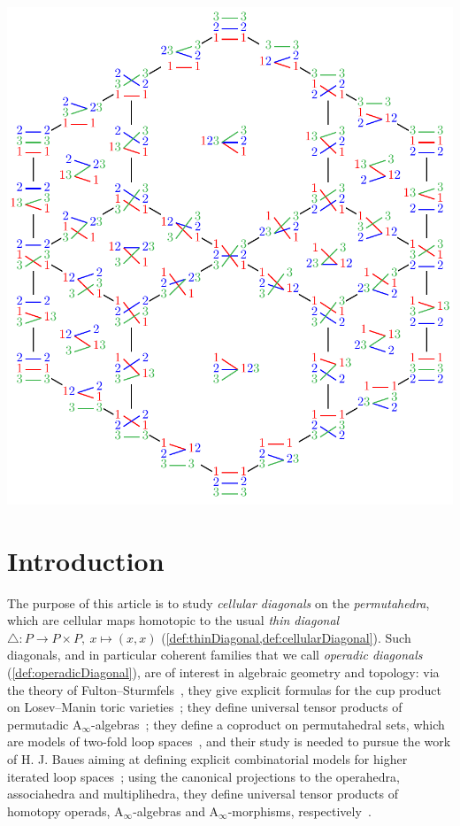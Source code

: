 \documentclass{amsart}
\theoremstyle{definition}
\newcommand{\Ainf}{\ensuremath{\mathrm{A}_\infty}}
\begin{document}
\vspace*{-.6cm}
\centerline{\includegraphics[scale=.75]{diagonalPermutahedron3}}
\vspace*{-.2cm}

\newpage
\enlargethispage{1cm}
\tableofcontents


\newpage
\section*{Introduction} 
\label{s:introduction}

The purpose of this article is to study \emph{cellular diagonals} on the \emph{permutahedra}, which are cellular maps homotopic to the usual \emph{thin diagonal} $\triangle : P \to P \times P,~ x \mapsto (x,x)$ (\cref{def:thinDiagonal,def:cellularDiagonal}).
Such diagonals, and in particular coherent families that we call \emph{operadic diagonals} (\cref{def:operadicDiagonal}), are of interest in algebraic geometry and topology: via the theory of Fulton--Sturmfels~\cite{FultonSturmfels}, they give explicit formulas for the cup product on Losev--Manin toric varieties~\cite{LosevManin}; they define universal tensor products of permutadic $\Ainf$-algebras~\cite{LodayRonco-permutads,Markl}; they define a coproduct on permutahedral sets, which are models of two-fold loop spaces~\cite{SaneblidzeUmble}, and their study is needed to pursue the work of H. J. Baues aiming at defining explicit combinatorial models for higher iterated loop spaces~\cite{Baues}; using the canonical projections to the operahedra, associahedra and multiplihedra, they define universal tensor products of homotopy operads, $\Ainf$-algebras and $\Ainf$-morphisms, respectively~\cite{LaplanteAnfossi,LaplanteAnfossiMazuir}.
\end{document}
